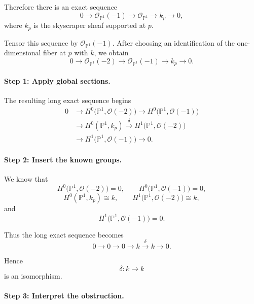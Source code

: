 \documentclass[12pt,a4paper]{article}
\theoremstyle{notespace}
\begin{document}
Therefore there is an exact sequence
\[
0
\longrightarrow
\mathcal{O}_{\mathbb{P}^{1}}(-1)
\longrightarrow
\mathcal{O}_{\mathbb{P}^{1}}
\longrightarrow
k_{p}
\longrightarrow
0,
\]
where \(k_{p}\) is the skyscraper sheaf supported at \(p\).

Tensor this sequence by \(\mathcal{O}_{\mathbb{P}^{1}}(-1)\). After choosing
an identification of the one-dimensional fiber at \(p\) with \(k\), we obtain
\[
0
\longrightarrow
\mathcal{O}_{\mathbb{P}^{1}}(-2)
\longrightarrow
\mathcal{O}_{\mathbb{P}^{1}}(-1)
\longrightarrow
k_{p}
\longrightarrow
0.
\]

\paragraph{Step 1: Apply global sections.}

The resulting long exact sequence begins
\[
\begin{aligned}
	0
	&\longrightarrow
	H^{0}\bigl(\mathbb{P}^{1},\mathcal{O}(-2)\bigr)
	\longrightarrow
	H^{0}\bigl(\mathbb{P}^{1},\mathcal{O}(-1)\bigr) \\
	&\longrightarrow
	H^{0}(\mathbb{P}^{1},k_{p})
	\xrightarrow{\delta}
	H^{1}\bigl(\mathbb{P}^{1},\mathcal{O}(-2)\bigr) \\
	&\longrightarrow
	H^{1}\bigl(\mathbb{P}^{1},\mathcal{O}(-1)\bigr)
	\longrightarrow
	0.
\end{aligned}
\]

\paragraph{Step 2: Insert the known groups.}

We know that
\[
H^{0}\bigl(\mathbb{P}^{1},\mathcal{O}(-2)\bigr)=0,
\qquad
H^{0}\bigl(\mathbb{P}^{1},\mathcal{O}(-1)\bigr)=0,
\]
\[
H^{0}(\mathbb{P}^{1},k_{p})\cong k,
\qquad
H^{1}\bigl(\mathbb{P}^{1},\mathcal{O}(-2)\bigr)\cong k,
\]
and
\[
H^{1}\bigl(\mathbb{P}^{1},\mathcal{O}(-1)\bigr)=0.
\]

Thus the long exact sequence becomes
\[
0
\longrightarrow
0
\longrightarrow
0
\longrightarrow
k
\xrightarrow{\delta}
k
\longrightarrow
0.
\]

Hence
\[
\delta:k\longrightarrow k
\]
is an isomorphism.

\paragraph{Step 3: Interpret the obstruction.}
\end{document}
